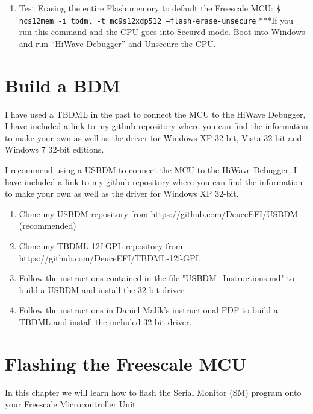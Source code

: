 \documentclass[12pt,notitlepage,onecolumn,oneside,openany]{memoir}
\begin{document}
\begin{enumerate}
\item \textsf{Test Erasing the entire Flash memory to default the Freescale MCU:} \newline
      \texttt{\$ hcs12mem -i tbdml -t mc9s12xdp512 –flash-erase-unsecure} \newline
      \textsf{***If you run this command and the CPU goes into Secured mode.  Boot into Windows and run “HiWave Debugger” and Unsecure the CPU.} 

\end{enumerate}

\chapter{\textsf{Build a BDM}}

\textsf{I have used a TBDML in the past to connect the MCU to the HiWave Debugger, I have included a link to my github repository where you can find the information to make your own as well as the driver for Windows XP 32-bit, Vista 32-bit and Windows 7 32-bit editions.} \newline

\textsf{I recommend using a USBDM to connect the MCU to the HiWave Debugger, I have included a link to my github repository where you can find the information to make your own as well as the driver for Windows XP 32-bit.} \newline

\begin{enumerate}
\item \textsf{Clone my USBDM repository from https://github.com/DeuceEFI/USBDM (recommended)}
\item \textsf{Clone my TBDML-12f-GPL repository from https://github.com/DeuceEFI/TBDML-12f-GPL}

\item \textsf{Follow the instructions contained in the file "USBDM_Instructions.md" to build a USBDM and install the 32-bit driver.}
\item \textsf{Follow the instructions in Daniel Malík's instructional PDF to build a TBDML and install the included 32-bit driver.}
\end{enumerate}

\chapter{\textsf{Flashing the Freescale MCU}}

\textsf{In this chapter we will learn how to flash the Serial Monitor (SM) program onto your Freescale Microcontroller Unit.} \newline
\end{document}
